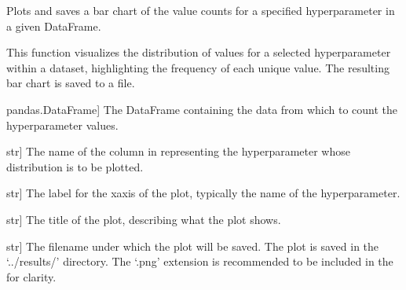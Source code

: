 \documentclass[letterpaper,10pt,english]{sphinxmanual}
\begin{document}
\begin{fulllineitems}
\label{\detokenize{utils:utils.hyperparameter_counts}}
\pysigstartsignatures
{}
\pysigstopsignatures
\sphinxAtStartPar
Plots and saves a bar chart of the value counts for a specified hyperparameter in a given DataFrame.

\sphinxAtStartPar
This function visualizes the distribution of values for a selected hyperparameter within a dataset, 
highlighting the frequency of each unique value. The resulting bar chart is saved to a file.
\begin{description}
\begin{description}
\sphinxlineitem{dataframe}{[}pandas.DataFrame{]}
\sphinxAtStartPar
The DataFrame containing the data from which to count the hyperparameter values.

\sphinxlineitem{hyperparameter}{[}str{]}
\sphinxAtStartPar
The name of the column in  representing the hyperparameter whose distribution is to be plotted.

\sphinxlineitem{x\_label}{[}str{]}
\sphinxAtStartPar
The label for the x\sphinxhyphen{}axis of the plot, typically the name of the hyperparameter.

\sphinxlineitem{title}{[}str{]}
\sphinxAtStartPar
The title of the plot, describing what the plot shows.

\sphinxlineitem{name}{[}str{]}
\sphinxAtStartPar
The filename under which the plot will be saved. The plot is saved in the ‘../results/’ directory.
The ‘.png’ extension is recommended to be included in the  for clarity.

\end{description}


\end{description}
\end{fulllineitems}
\end{document}
